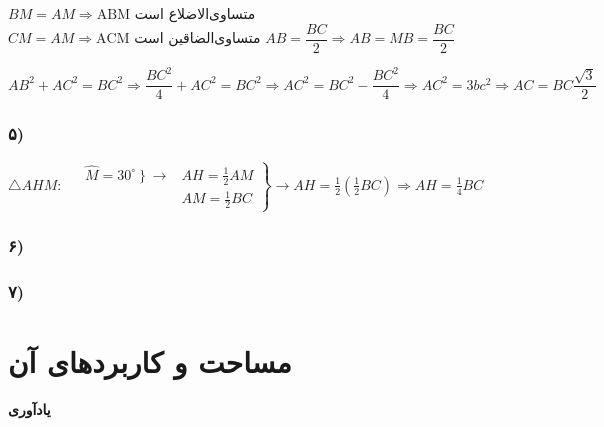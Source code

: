 \documentclass[12pt, a4paper, twoside]{book}
\begin{document}
			\begin{flushleft}
					$
					BM = AM \Rightarrow \text{ABM متساوی‌الاضلاع است}
				$
				$
					CM = AM \Rightarrow \text{ACM متساوی‌الضاقین است}
				$
				$
					AB = \dfrac{BC}{2} \Rightarrow AB =MB = \dfrac{BC}{2}
				$
				
				$
					AB^2 + AC^2 = BC^2 \Rightarrow \dfrac{BC^2}{4} + AC^2 = BC^2 \Rightarrow AC^2 = BC^2 - \dfrac{BC^2}{4} \Rightarrow AC^2 = 3bc^2 \Rightarrow AC = BC \dfrac{\sqrt{3}}{2}
				$
			\end{flushleft}

	\subsubsection[5]{۵)}
	     	\begin{flushleft}
	     		$ \triangle AHM:$
	     		$
	     			\left.
		     			\begin{array}{ccc}
		     			    &	\widehat{M} = \left. 30^{\circ} \right\} \rightarrow & AH = \frac12 AM \\
		     				& &AM = \frac12 BC
		     			\end{array}
	     			\right\}
	     			\rightarrow AH = \frac12 \left( \frac12 BC \right) \Rightarrow AH = \frac14 BC
	     		$
	     	\end{flushleft}


	\subsubsection[6]{۶)}
	
	\subsubsection[7]{۷)}
	



\newpage
\section{مساحت و کاربردهای آن}

\textbf{یادآوری}
\end{document}
